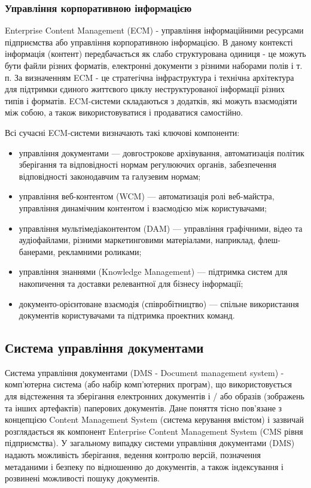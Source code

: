 \subsubsection{Управління корпоративною інформацією}
Enterprise Content Management (ECM) - управління інформаційними ресурсами підприємства або управління корпоративною інформацією.
В даному контексті інформація (контент) передбачається як слабо структурована одиниця - це можуть бути файли різних форматів, електронні документи з різними наборами полів і т. п.
За визначенням ECM - це стратегічна інфраструктура і технічна архітектура для підтримки єдиного життєвого циклу неструктурованої інформації різних типів і форматів. 
ECM-системи складаються з додатків, які можуть взаємодіяти між собою, а також використовуватися і продаватися самостійно. 
\par Всі сучасні ECM-системи визначають такі ключові компоненти:
\begin{itemize}
\item управління документами --- довгострокове архівування, автоматизація політик зберігання та відповідності нормам регулюючих органів, забезпечення відповідності законодавчим та галузевим нормам;
\item управління веб-контентом (WCM) --- автоматизація ролі веб-майстра, управління динамічним контентом і взаємодією між користувачами;
\item  управління мультімедіаконтентом (DAM) --- управління графічними, відео та аудіофайлами, різними маркетинговими матеріалами, наприклад, флеш-банерами, рекламними роликами;
\item управління знаннями (Knowledge Management) --- підтримка систем для накопичення та доставки релевантної для бізнесу інформації;
\item документо-орієнтоване взаємодія (співробітництво) --- спільне використання документів користувачами та підтримка проектних команд.
\end{itemize}


\subsection{Система управління документами}
Система управління документами (DMS - Document management system) - комп'ютерна система (або набір комп'ютерних програм), що використовується для відстеження та зберігання електронних документів і / або образів (зображень та інших артефактів) паперових документів.
Дане поняття тісно пов'язане з концепцією Content Management System (система керування вмістом) і зазвичай розглядається як компонент Enterprise Content Management System (CMS рівня підприємства).
У загальному випадку системи управління документами (DMS) надають можливість зберігання, ведення контролю версій, позначення метаданими і безпеку по відношенню до документів, а також індексування і розвинені можливості пошуку документів.
